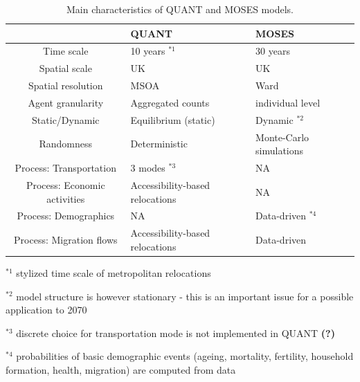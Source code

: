 \documentclass[11pt]{article}
\begin{document}
\begin{table}
\begin{threeparttable}
	\caption{Main characteristics of QUANT and MOSES models.}\label{tab:comparison}
	\centering
	\begin{tabular}{|c|p{6cm}|p{6cm}|}
	\toprule
	& QUANT & MOSES \\
	\midrule
Time scale & 10 years $^{\ast 1}$ & 30 years \\
Spatial scale & UK & UK \\
Spatial resolution & MSOA & Ward \\
Agent granularity & Aggregated counts & individual level \\
Static/Dynamic & Equilibrium (static) & Dynamic $^{\ast 2}$ \\
Randomness & Deterministic & Monte-Carlo simulations \\
Process: Transportation & 3 modes $^{\ast 3}$ & NA \\
Process: Economic activities & Accessibility-based relocations & NA \\
Process: Demographics & NA & Data-driven $^{\ast 4}$ \\
Process: Migration flows & Accessibility-based relocations & Data-driven \\
\bottomrule
	\end{tabular}
	\begin{tablenotes}
      \small
      \item $^{\ast 1}$ stylized time scale of metropolitan relocations \cite{wegener2004land}
      \item $^{\ast 2}$ model structure is however stationary - this is an important issue for a possible application to 2070
      \item $^{\ast 3}$ discrete choice for transportation mode is not implemented in QUANT \textbf{(?)} 
      \item $^{\ast 4}$ probabilities of basic demographic events (ageing, mortality, fertility, household formation, health, migration) are computed from data
    \end{tablenotes}
	\end{threeparttable}
\end{table}
\end{document}
